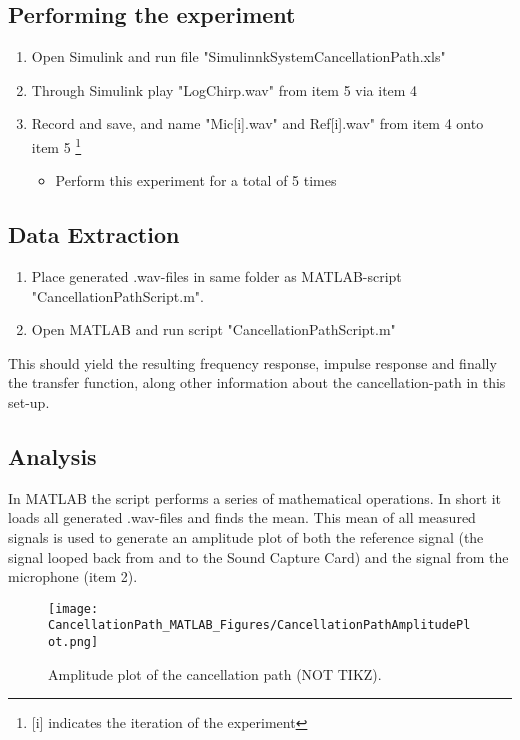 \subsection{Performing the experiment}
\begin{enumerate}
	\item Open Simulink\textsuperscript{\textregistered} and run file "SimulinnkSystemCancellationPath.xls"
	\item Through Simulink\textsuperscript{\textregistered} play "LogChirp.wav" from item 5 via item 4
	\item Record and save, and name "Mic[i].wav" and Ref[i].wav" from item 4 onto item 5 \footnote{[i] indicates the iteration of the experiment}
	\begin{itemize}
		\item[] Perform this experiment for a total of 5 times
	\end{itemize}
\end{enumerate}


\subsection{Data Extraction}
\begin{enumerate}
	\item Place generated .wav-files in same folder as MATLAB\textsuperscript{\textregistered}-script "CancellationPathScript.m".
	\item Open MATLAB\textsuperscript{\textregistered} and run script "CancellationPathScript.m"
\end{enumerate}
This should yield the resulting frequency response, impulse response and finally the transfer function, along other information about the cancellation-path in this set-up.

\subsection{Analysis}
In MATLAB\textsuperscript{\textregistered} the script performs a series of mathematical operations. In short it loads all generated .wav-files and finds the mean. This mean of all measured signals is used to generate an amplitude plot of both the reference signal (the signal looped back from and to the Sound Capture Card) and the signal from the microphone (item 2).

\begin{figure}[H]
	\centering
	\texttt{[image: CancellationPath\_MATLAB\_Figures/CancellationPathAmplitudePlot.png]}
	\caption{Amplitude plot of the cancellation path (NOT TIKZ).}
	\label{AmplitudePlotCancellationPath}
\end{figure}


